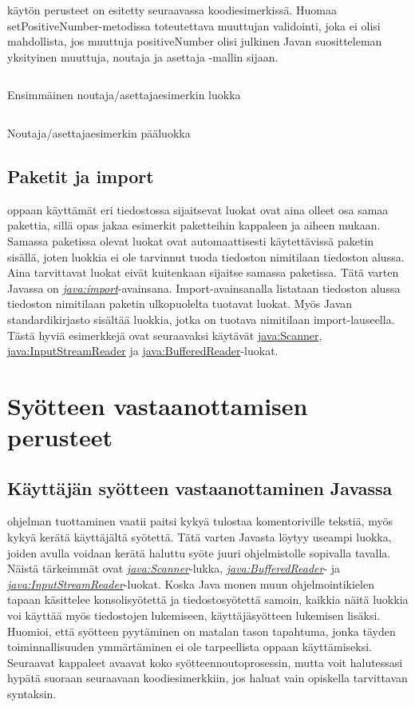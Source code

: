 \documentclass{tufte-book}
\newcommand{\java}[1]{\underline{\gls{java:#1}}}
\newcommand{\newjava}[1]{\textit{\java{#1}}}
\newcommand{\code}[3]{
\begin{listing}
    \inputminted{java}{OhjelmointiopasEsimerkit/src/#1/#2.java}
    \caption{#3}
    \label{Java-#1-#2}
\end{listing}
}
\begin{document}
 käytön perusteet on esitetty seuraavassa koodiesimerkissä.
Huomaa setPositiveNumber-metodissa toteutettava muuttujan validointi, joka ei olisi mahdollista,
jos muuttuja positiveNumber olisi julkinen Javan suositteleman yksityinen muuttuja, noutaja ja
asettaja -mallin sijaan.

\code{week2/gettersetterexample}{NumberStorage}{Ensimmäinen noutaja/asettajaesimerkin luokka}
\code{week2/gettersetterexample}{GetterSetterExample}{Noutaja/asettajaesimerkin pääluokka}

\subsection{Paketit ja import}
\label{import}

 oppaan käyttämät eri tiedostossa sijaitsevat luokat ovat aina olleet
osa samaa pakettia, sillä opas jakaa esimerkit paketteihin kappaleen ja aiheen mukaan. Samassa
paketissa olevat luokat ovat automaattisesti käytettävissä paketin sisällä, joten luokkia ei ole
tarvinnut tuoda tiedoston nimitilaan tiedoston alussa. Aina tarvittavat luokat eivät kuitenkaan
sijaitse samassa paketissa. Tätä varten Javassa on \newjava{import}-avainsana. Import-avainsanalla
listataan tiedoston alussa tiedoston nimitilaan paketin ulkopuolelta tuotavat luokat. Myös Javan
standardikirjasto sisältää luokkia, jotka on tuotava nimitilaan import-lauseella. Tästä hyviä
esimerkkejä ovat seuraavaksi käytävät \java{Scanner}, \java{InputStreamReader} ja
\java{BufferedReader}-luokat.


\section{Syötteen vastaanottamisen perusteet}
\label{syötteestä}

\subsection{Käyttäjän syötteen vastaanottaminen Javassa}
\label{input}

 ohjelman tuottaminen vaatii paitsi kykyä tulostaa
komentoriville tekstiä, myös kykyä kerätä käyttäjältä syötettä. Tätä varten Javasta löytyy
useampi luokka, joiden avulla voidaan kerätä haluttu syöte juuri ohjelmistolle sopivalla tavalla.
Näistä tärkeimmät ovat \newjava{Scanner}-lukka, \newjava{BufferedReader}- ja
\newjava{InputStreamReader}-luokat. Koska Java monen muun ohjelmointikielen tapaan käsittelee
konsolisyötettä ja tiedostosyötettä samoin, kaikkia näitä luokkia voi käyttää myös tiedostojen
lukemiseen, käyttäjäsyötteen lukemisen lisäksi. Huomioi, että syötteen pyytäminen on matalan
tason tapahtuma, jonka täyden toiminnallisuuden ymmärtäminen ei ole tarpeellista oppaan
käyttämiseksi. Seuraavat kappaleet avaavat koko syötteennoutoprosessin, mutta voit halutessasi
hypätä suoraan seuraavaan koodiesimerkkiin, jos haluat vain opiskella tarvittavan syntaksin.
\end{document}
